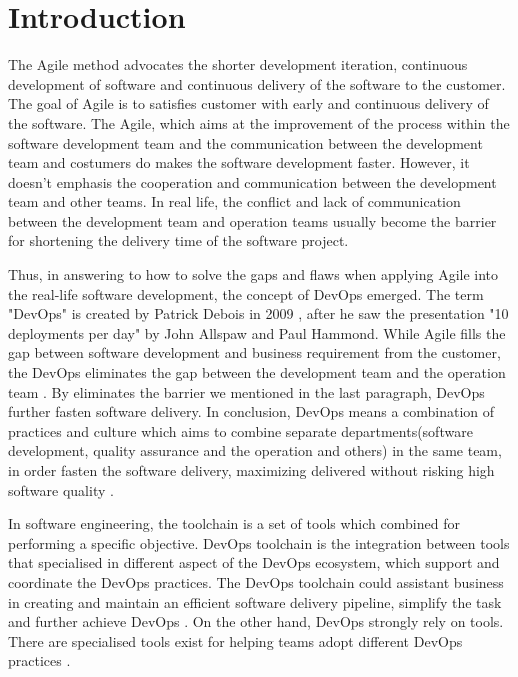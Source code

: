 \chapter{Introduction}
\label{chp:introduction}
The Agile method advocates the shorter development iteration, continuous development of software and continuous delivery of the software to the customer. The goal \cite{beck2001manifesto} of Agile is to satisfies customer with early and continuous delivery of the software.
The Agile, which aims at the improvement of the process within the software development team and the communication between the development team and costumers \cite{miglierina2014application} do makes the software development faster. However, it doesn't emphasis the cooperation and communication between the development team and other teams. In real life, the conflict and lack of communication between the development team and operation teams usually become the barrier for shortening the delivery time of the software project.
\par
Thus, in answering to how to solve the gaps and flaws when applying Agile into the real-life software development, the concept of DevOps emerged. The term "DevOps" is created by Patrick Debois in 2009 \cite{kim2016devops}, after he saw the presentation "10 deployments per day" by John Allspaw and Paul Hammond. While Agile fills the gap between software development and business requirement from the customer, the DevOps eliminates the gap between the development team and the operation team \cite{WhatisaD20:online}. By eliminates the barrier we mentioned in the last paragraph, DevOps further fasten software delivery. In conclusion, DevOps means a combination of practices and culture which aims to combine separate departments(software development, quality assurance and the operation and others) in the same team, in order fasten the software delivery, maximizing delivered without risking high software quality \cite{DevOpsWi87:online}\cite{ebert2016devops}.
\par
In software engineering, the toolchain is a set of tools which combined for performing a specific objective. DevOps toolchain is the integration between tools that specialised in different aspect of the DevOps ecosystem, which support and coordinate the DevOps practices. The DevOps toolchain could assistant business in creating and maintain an efficient software delivery pipeline, simplify the task and further achieve DevOps \cite{DevOpsto7:online}. On the other hand, DevOps strongly rely on tools. There are specialised tools exist for helping teams adopt different DevOps practices \cite{zhu2016devops}.

